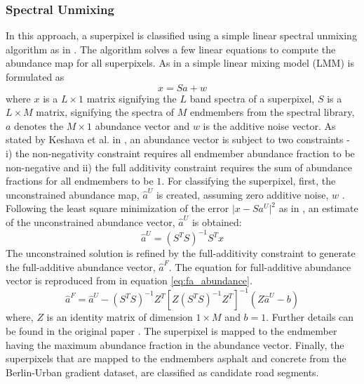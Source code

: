 \documentclass[12pt,twoside]{article}
\theoremstyle{plain}
\theoremstyle{definition}
\theoremstyle{remark}
\begin{document}
\subsubsection{Spectral Unmixing} In this approach, a superpixel is classified using a simple linear spectral unmixing algorithm as in \cite{keshava2002spectral}. The algorithm solves a few linear equations to compute the abundance map for all superpixels. As in \cite{keshava2002spectral} a simple linear mixing model (LMM) is formulated as 
\begin{equation}
\label{eq:LMM}
x = Sa + w
\end{equation}
where $x$ is a $L \times 1$ matrix signifying the $L$ band spectra of a superpixel, $S$ is a $L \times M$ matrix, signifying the spectra of $M$ endmembers from the spectral library, $a$ denotes the $M \times 1$ abundance vector and $w$ is the additive noise vector. As stated by Keshava et al. in \cite{keshava2002spectral}, an abundance vector is subject to two constraints - i) the non-negativity constraint requires all endmember abundance fraction to be non-negative and ii) the full additivity constraint requires the sum of abundance fractions for all endmembers to be $1$.
For classifying the superpixel, first, the unconstrained abundance map, $\hat{a}^U$ is created, assuming zero additive noise, $w$ \cite{keshava2002spectral}. Following the least square minimization of the error $ \lvert x - Sa^U \rvert^2$ as in \cite{keshava2002spectral}, an estimate of the unconstrained abundance vector, $\hat{a}^U$ is obtained:
\begin{equation}
\label{eq:un_abundance}
\hat{a}^U = (S^T S)^{-1} S^T x
\end{equation}
The unconstrained solution is refined by the full-additivity constraint to generate the full-additive abundance vector, $\hat{a}^F$. The equation for full-additive abundance vector is reproduced from \cite{keshava2002spectral} in equation \ref{eq:fa_abundance}.
\begin{equation}
\label{eq:fa_abundance}
\hat{a}^F = \hat{a}^U - (S^T S)^{-1} Z^T [Z(S^T S)^{-1} Z^T]^{-1}(Z \hat{a}^U - b)
\end{equation}
where, $Z$ is an identity matrix of dimension $1 \times M$ and $b = 1$. Further details can be found in the original paper \cite{keshava2002spectral}. The superpixel is mapped to the endmember having the maximum abundance fraction in the abundance vector. Finally, the superpixels that are mapped to the endmembers asphalt and concrete from the Berlin-Urban gradient dataset, are classified as candidate road segments.
\end{document}
